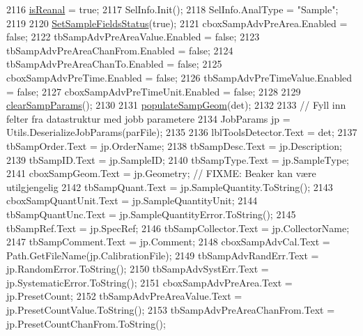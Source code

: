 \begin{DoxyCode}
2116                 \hyperlink{class_scintilab_1_1_form_main_a389e9c6697c567d84058d178053a837c}{isReanal} = \textcolor{keyword}{true};
2117                 SelInfo.Init();
2118                 SelInfo.AnalType = \textcolor{stringliteral}{"Sample"};
2119                 
2120                 \hyperlink{class_scintilab_1_1_form_main_ad85e690e8d5fa96cbf9c0a7632bd7140}{SetSampleFieldsStatus}(\textcolor{keyword}{true});
2121                 cboxSampAdvPreArea.Enabled = \textcolor{keyword}{false};
2122                 tbSampAdvPreAreaValue.Enabled = \textcolor{keyword}{false};
2123                 tbSampAdvPreAreaChanFrom.Enabled = \textcolor{keyword}{false};
2124                 tbSampAdvPreAreaChanTo.Enabled = \textcolor{keyword}{false};
2125                 cboxSampAdvPreTime.Enabled = \textcolor{keyword}{false};
2126                 tbSampAdvPreTimeValue.Enabled = \textcolor{keyword}{false};
2127                 cboxSampAdvPreTimeUnit.Enabled = \textcolor{keyword}{false};
2128 
2129                 \hyperlink{class_scintilab_1_1_form_main_a01c213a0d1456773b92d4d431a9d1cdb}{clearSampParams}();
2130 
2131                 \hyperlink{class_scintilab_1_1_form_main_ace8f1fb51afa44804deec60a6dc42bcb}{populateSampGeom}(det);
2132 
2133                 \textcolor{comment}{// Fyll inn felter fra datastruktur med jobb parametere}
2134                 JobParams jp = Utils.DeserializeJobParams(parFile);
2135 
2136                 lblToolsDetector.Text = det;
2137                 tbSampOrder.Text = jp.OrderName;
2138                 tbSampDesc.Text = jp.Description;
2139                 tbSampID.Text = jp.SampleID;
2140                 tbSampType.Text = jp.SampleType;
2141                 cboxSampGeom.Text = jp.Geometry; \textcolor{comment}{// FIXME: Beaker kan være utilgjengelig}
2142                 tbSampQuant.Text = jp.SampleQuantity.ToString();
2143                 cboxSampQuantUnit.Text = jp.SampleQuantityUnit;
2144                 tbSampQuantUnc.Text = jp.SampleQuantityError.ToString();
2145                 tbSampRef.Text = jp.SpecRef;
2146                 tbSampCollector.Text = jp.CollectorName;
2147                 tbSampComment.Text = jp.Comment;
2148                 cboxSampAdvCal.Text = Path.GetFileName(jp.CalibrationFile);
2149                 tbSampAdvRandErr.Text = jp.RandomError.ToString();
2150                 tbSampAdvSystErr.Text = jp.SystematicError.ToString();
2151                 cboxSampAdvPreArea.Text = jp.PresetCount;
2152                 tbSampAdvPreAreaValue.Text = jp.PresetCountValue.ToString();
2153                 tbSampAdvPreAreaChanFrom.Text = jp.PresetCountChanFrom.ToString();

\end{DoxyCode}
